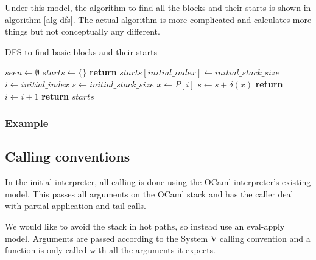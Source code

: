 Under this model, the algorithm to find all the blocks and their starts is shown in algorithm
\ref{alg-dfs}. The actual algorithm is more complicated and calculates more things but not
conceptually any different.

\begin{algorithm}
      \caption{DFS to find basic blocks and their starts}\label{alg-dfs}
      \begin{algorithmic}[1]
            \State $seen \gets \emptyset$
            \State $starts \gets \{\}$
            \State \textbf{return}
            \EndIf
            \State $starts[initial\_index] \gets initial\_stack\_size$
            \State $i \gets initial\_index$
            \State $s \gets initial\_stack\_size$
            \Repeat
            \State $x \gets P[i]$
            \State $s \gets s + \delta(x)$
            \State {}
            \EndFor
            \State {}
            \EndIf
            \State \textbf{return}
            \Else
            \State $i \gets i + 1$
            \EndIf
            \EndFunction
            \State {}
            \State \textbf{return} $starts$
            \EndFunction
      \end{algorithmic}
\end{algorithm}

\subsubsection{Example}

\subsection{Calling conventions}

In the initial interpreter, all calling is done using the OCaml interpreter's existing model. This
passes all arguments on the OCaml stack and has the caller deal with partial application and tail
calls.

We would like to avoid the stack in hot paths, so instead use an eval-apply model. Arguments are
passed according to the System V calling convention and a function is only called with all the
arguments it expects.

